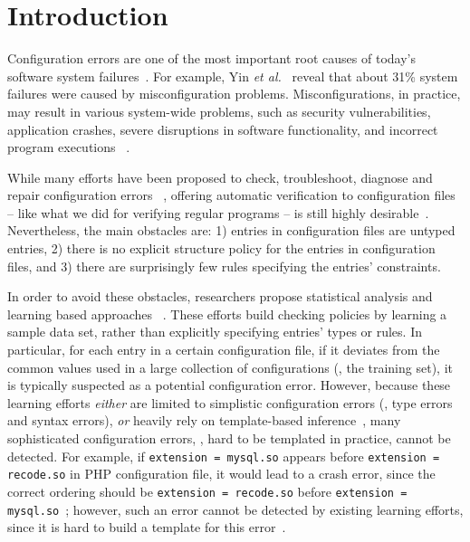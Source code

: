 \section{Introduction}
\label{sec-intro}

Configuration errors are one of the most important root causes of
today's software system failures~\cite{xu15systems, yin11anempirical}.
For example, Yin {\em et al.}~\cite{yin11anempirical} reveal
that about 31\% system failures were caused by misconfiguration problems. 
Misconfigurations, in practice, may result in various
system-wide problems, such as security vulnerabilities, 
application crashes, severe disruptions in software
functionality, and incorrect program executions%
~\cite{zhang14encore, yuan11context, xu13do, xu15hey}.  

While many efforts have been proposed 
to check, troubleshoot, diagnose and repair configuration errors%
~\cite{attariyan10automating,
su07autobash, whitaker04configuration}, 
offering automatic verification to configuration files -- like what we
did for verifying regular programs -- is still highly
desirable~\cite{wang04automatic, zhang14encore}.
Nevertheless, the main obstacles are:
1) entries in configuration files are untyped entries, 2) there
is no explicit structure policy for the entries in configuration
files, and 3) there are surprisingly few rules specifying the
entries' constraints.

In order to avoid these obstacles,
researchers propose statistical analysis and learning based approaches%
~\cite{wang04automatic, zhang14encore, yuan11context}. 
These efforts build checking policies by learning a sample 
data set, rather than explicitly specifying entries' types or rules.
In particular, for each entry in a certain configuration file, 
if it deviates from the common values used in a large collection
of configurations (\ie, the training set), it is typically
suspected as a potential configuration error.
However, because these learning 
efforts {\em either} are limited to simplistic 
configuration errors (\eg, type errors and syntax errors), 
{\em or} heavily rely on template-based inference~\cite{zhang14encore}, 
many sophisticated configuration errors, 
\eg, hard to be templated in practice, cannot be detected.
For example, if {\tt extension = mysql.so} appears 
before {\tt extension = recode.so} in PHP configuration file,  
it would lead to a crash error, since the correct ordering 
should be {\tt extension = recode.so} before 
{\tt extension = mysql.so}~\cite{yin11anempirical};
however, such an error cannot be detected by existing
learning efforts, since it is hard to build a template for this
error~\cite{xu15systems}.

